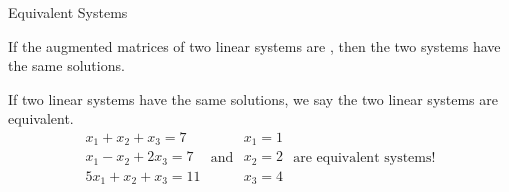 \documentclass[xcolor=dvipsnames,aspectratio=169,t]{beamer}
\begin{document}
\begin{frame}{Equivalent Systems}

  \bi
\ii If the augmented matrices of two linear systems are , then the two systems have the same solutions.

  \ii If two linear systems have the same solutions, we say \alert{the two linear systems are equivalent}.
\alert{
\[    \begin{array}{l}
     x_1 +x_2 +x_3=7 \\
     x_1 -x_2 +2x_3= 7\\
     5x_1+x_2+x_3=11
\end{array}  \mbox{ and }
 \begin{array}{l}
     x_1 =1 \\
      x_2 = 2\\
     x_3 =4 
 \end{array} \mbox{ are equivalent systems! }  \]}

\ei
\end{frame}
\end{document}
